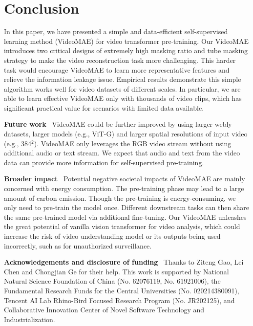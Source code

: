 \documentclass{article}
\begin{document}
\vspace{-1.2mm}
\section{Conclusion}
\label{sec:conclusion}
In this paper, we have presented a simple and data-efficient self-supervised learning method (VideoMAE) for video transformer pre-training. Our VideoMAE introduces two critical designs of extremely high masking ratio and tube masking strategy to make the video reconstruction task more challenging. This harder task would encourage VideoMAE to learn more representative features and relieve the information leakage issue. Empirical results demonstrate this simple algorithm works well for video datasets of different scales. In particular, we are able to learn effective VideoMAE only with thousands of video clips, which has significant practical value for scenarios with limited data available.

{\flushleft \bf Future work} \ VideoMAE could be further improved by using larger webly datasets, larger models (e.g., ViT-G) and larger spatial resolutions of input video (e.g., 384$^2$). VideoMAE only leverages the RGB video stream without using additional audio or text stream. We expect that audio and text from the video data can provide more information for self-supervised pre-training. 

{\flushleft \bf Broader impact} \ Potential negative societal impacts of VideoMAE are mainly concerned with energy consumption.
The pre-training phase may lead to a large amount of carbon emission. Though the pre-training is energy-consuming, we only need to pre-train the model once. 
Different downstream tasks can then share the same pre-trained model via additional fine-tuning. 
Our VideoMAE unleashes the great potential of vanilla vision transformer for video analysis, which could increase the risk of video understanding model or its outputs being used incorrectly, such as for unauthorized surveillance.

{\flushleft \bf Acknowledgements and disclosure of funding} \ Thanks to Ziteng Gao, Lei Chen and Chongjian Ge for their help. This work is supported by National Natural Science Foundation of China (No. 62076119, No. 61921006), the Fundamental Research Funds for the Central Universities (No. 020214380091), Tencent AI Lab Rhino-Bird Focused Research Program (No. JR202125), and Collaborative Innovation Center of Novel Software Technology and Industrialization.

\clearpage
{\small


}
\end{document}
